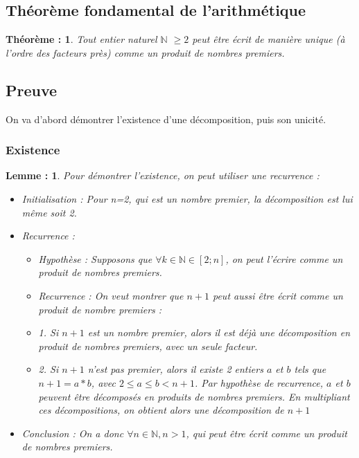 \documentclass[titlepage]{article}
\newtheorem{theorem}{Théorème :}
\newtheorem{lemme}{Lemme :}
\begin{document}
\newpage

\subsection{Théorème fondamental de l'arithmétique}

\begin{theorem}
Tout entier naturel $\mathbb{N}$ $\geq 2$ peut être écrit de manière unique (à l'ordre des facteurs près) comme un produit de nombres premiers.
\end{theorem}

\subsection{Preuve}

\hspace{1 cm}On va d'abord démontrer l'existence d'une décomposition, puis son unicité.

\subsubsection{Existence}
\begin{lemme}
Pour démontrer l'existence, on peut utiliser une recurrence :
\begin{itemize}
\item Initialisation :
Pour n=2, qui est un nombre premier, la décomposition est lui même soit 2.
\item Recurrence :
\begin{itemize}
\item Hypothèse :
Supposons que $\forall k \in \mathbb{N} \in [2;n]$, on peut l'écrire comme un produit de nombres premiers.
\item Recurrence :
On veut montrer que $n+1$ peut aussi être écrit comme un produit de nombre premiers :
\item 1. Si $n+1$ est un nombre premier, alors il est déjà une décomposition en produit de nombres premiers, avec un seule facteur.
\item 2. Si $n+1$ n'est pas premier, alors il existe 2 entiers $a$ et $b$ tels que $n + 1 = a * b$, avec $2 \le a \le b < n+1$. Par hypothèse de recurrence, $a$ et $b$ peuvent être décomposés en produits de nombres premiers. En multipliant ces décompositions, on obtient alors une décomposition de $n+1$
\end{itemize}
\item Conclusion :
On a donc $\forall n \in \mathbb{N}, n > 1$, qui peut être écrit comme un produit de nombres premiers.
\end{itemize}
\end{lemme}
\end{document}
